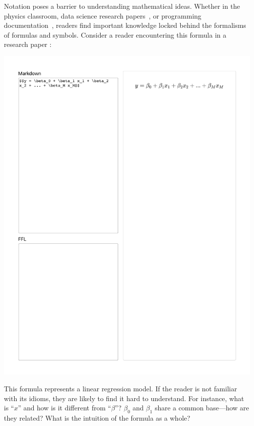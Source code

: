 Notation poses a barrier to understanding mathematical ideas. Whether in the physics classroom, data science research papers~\cite{ref:mysore2023how}, or programming documentation~\cite{ref:cai2019software}, readers find important knowledge locked behind the formalisms of formulas and symbols. 
Consider a reader encountering this formula in a research paper \cite{ref:hohman2019gamut}:


\begin{center}
\vspace{1ex}
\includegraphics[width=0.62\linewidth]{figures/pre-aug-intro}
\end{center}
\vspace{-0.5ex}

This formula represents a linear regression model. If the reader is not familiar with its idioms, they are likely to find it hard to understand. For instance, what is ``$x$'' and how is it different from ``$\beta$''? $\beta_0$ and $\beta_1$ share a common base---how are they related? What is the intuition of the formula as a whole?

